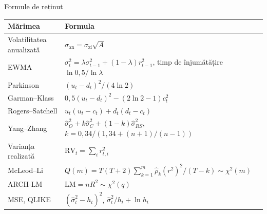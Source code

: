 \begin{frame}{Formule de reținut}
\itemsize{\small}
{\renewcommand{\arraystretch}{1.4}\begin{center}
\small
\begin{tabular}{ll}
\toprule
\textbf{Mărimea} & \textbf{Formula} \\
\midrule
Volatilitatea anualizată & $\sigma_{\text{an}} = \sigma_{\text{zi}}\sqrt{A}$ \\
EWMA & $\sigma_t^2 = \lambda\sigma_{t-1}^2 + (1-\lambda)r_{t-1}^2$, \quad timp de înjumătățire $\ln 0{,}5/\ln\lambda$ \\
Parkinson & $(u_t - d_t)^2/(4\ln 2)$ \\
Garman--Klass & $0{,}5(u_t - d_t)^2 - (2\ln 2 - 1)c_t^2$ \\
Rogers--Satchell & $u_t(u_t - c_t) + d_t(d_t - c_t)$ \\
Yang--Zhang & $\hat\sigma_O^2 + k\hat\sigma_C^2 + (1-k)\hat\sigma_{RS}^2$, \quad $k = 0{,}34/(1{,}34 + (n+1)/(n-1))$ \\
Varianța realizată & $\mathrm{RV}_t = \sum_i r_{t,i}^2$ \\
McLeod--Li & $Q(m) = T(T+2)\sum_{k=1}^m \hat\rho_k(r^2)^2/(T-k) \sim \chi^2(m)$ \\
ARCH-LM & $\mathrm{LM} = nR^2 \sim \chi^2(q)$ \\
MSE, QLIKE & $(\hat\sigma_t^2 - h_t)^2$, \quad $\hat\sigma_t^2/h_t + \ln h_t$ \\
\bottomrule
\end{tabular}
\end{center}
}
\end{frame}


